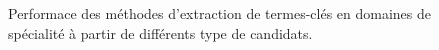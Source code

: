 \begin{figure}
      \caption{Performace des méthodes d'extraction de termes-clés en domaines
               de spécialité à partir de différents type de candidats.
               \label{fig:resultats}}
    \end{figure}

